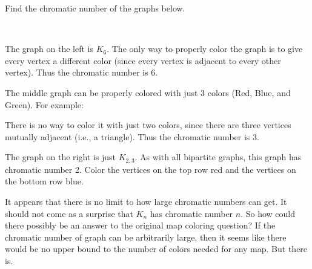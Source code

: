 \documentclass[12pt]{article}
\begin{document}
\begin{example}
  Find the chromatic number of the graphs below.
  \begin{center}
    \hfill
    \hfill
    \hfill
  \hfill ~
  \end{center}

\begin{solution}
  The graph on the left is $K_6$.  The only way to properly color the graph is to give every vertex a different color (since every vertex is adjacent to every other vertex).  Thus the chromatic number is 6.

  The middle graph can be properly colored with just 3 colors (Red, Blue, and Green).  For example:

  \begin{center}
  \end{center}

  There is no way to color it with just two colors, since there are three vertices mutually adjacent (i.e., a triangle).  Thus the chromatic number is 3.

  The graph on the right is just $K_{2,3}$.  As with all bipartite graphs, this graph has chromatic number 2.   Color the vertices on the top row red and the vertices on the bottom row blue.
\end{solution}

\end{example}

It appears that there is no limit to how large chromatic numbers can get.  It should not come as a surprise that $K_n$ has chromatic number $n$.  So how could there possibly be an answer to the original map coloring question?  If the chromatic number of graph can be arbitrarily large, then it seems like there would be no upper bound to the number of colors needed for any map.  But there is.
\end{document}

